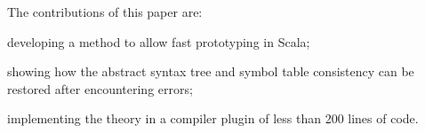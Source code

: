 The contributions of this paper are:
\begin{packed_item}
\item developing a method to allow fast prototyping in Scala;
\item showing how the abstract syntax tree and symbol table consistency can be restored after encountering errors;
\item implementing the theory in a compiler plugin of less than 200 lines of code.
\end{packed_item}

